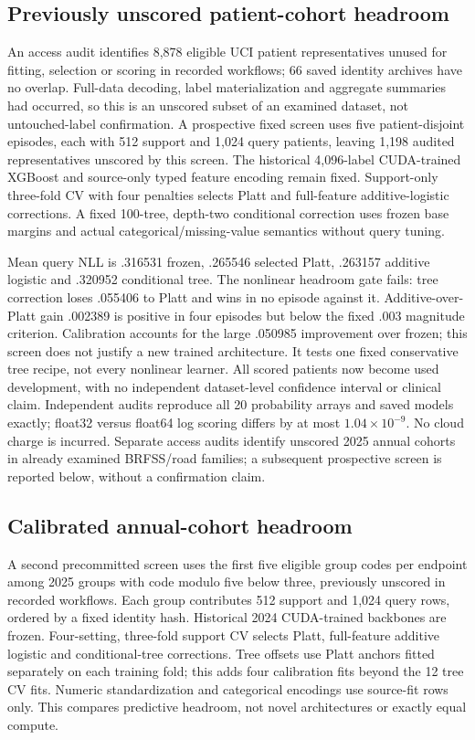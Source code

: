 \documentclass[10pt]{article}
\begin{document}
\subsection{Previously unscored patient-cohort headroom}
An access audit identifies 8,878 eligible UCI patient representatives unused for fitting, selection or scoring in recorded workflows; 66 saved identity archives have no overlap. Full-data decoding, label materialization and aggregate summaries had occurred, so this is an unscored subset of an examined dataset, not untouched-label confirmation. A prospective fixed screen uses five patient-disjoint episodes, each with 512 support and 1,024 query patients, leaving 1,198 audited representatives unscored by this screen. The historical 4,096-label CUDA-trained XGBoost and source-only typed feature encoding remain fixed. Support-only three-fold CV with four penalties selects Platt and full-feature additive-logistic corrections. A fixed 100-tree, depth-two conditional correction uses frozen base margins and actual categorical/missing-value semantics without query tuning.

Mean query NLL is .316531 frozen, .265546 selected Platt, .263157 additive logistic and .320952 conditional tree. The nonlinear headroom gate fails: tree correction loses .055406 to Platt and wins in no episode against it. Additive-over-Platt gain .002389 is positive in four episodes but below the fixed .003 magnitude criterion. Calibration accounts for the large .050985 improvement over frozen; this screen does not justify a new trained architecture. It tests one fixed conservative tree recipe, not every nonlinear learner. All scored patients now become used development, with no independent dataset-level confidence interval or clinical claim. Independent audits reproduce all 20 probability arrays and saved models exactly; float32 versus float64 log scoring differs by at most $1.04\times10^{-9}$. No cloud charge is incurred. Separate access audits identify unscored 2025 annual cohorts in already examined BRFSS/road families; a subsequent prospective screen is reported below, without a confirmation claim.

\subsection{Calibrated annual-cohort headroom}
A second precommitted screen uses the first five eligible group codes per endpoint among 2025 groups with code modulo five below three, previously unscored in recorded workflows. Each group contributes 512 support and 1,024 query rows, ordered by a fixed identity hash. Historical 2024 CUDA-trained backbones are frozen. Four-setting, three-fold support CV selects Platt, full-feature additive logistic and conditional-tree corrections. Tree offsets use Platt anchors fitted separately on each training fold; this adds four calibration fits beyond the 12 tree CV fits. Numeric standardization and categorical encodings use source-fit rows only. This compares predictive headroom, not novel architectures or exactly equal compute.
\end{document}
